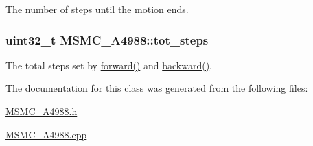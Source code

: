 The number of steps until the motion ends. 

\hypertarget{class_m_s_m_c___a4988_aa7de83eb15a9f82533b898146921939b}{
\subsubsection[{tot\+\_\+steps}]{\setlength{\rightskip}{0pt plus 5cm}uint32\+\_\+t M\+S\+M\+C\+\_\+\+A4988\+::tot\+\_\+steps\hspace{0.3cm}{\ttfamily [private]}}}\label{class_m_s_m_c___a4988_aa7de83eb15a9f82533b898146921939b}


The total steps set by \hyperlink{class_m_s_m_c___a4988_a9acdbabf546656a6436e89579e8fcfca}{forward()} and \hyperlink{class_m_s_m_c___a4988_a836bed9e28e723ead2a94446bb704869}{backward()}. 



The documentation for this class was generated from the following files\+:\begin{DoxyCompactItemize}
\item 
\hyperlink{_m_s_m_c___a4988_8h}{M\+S\+M\+C\+\_\+\+A4988.\+h}\item 
\hyperlink{_m_s_m_c___a4988_8cpp}{M\+S\+M\+C\+\_\+\+A4988.\+cpp}\end{DoxyCompactItemize}
